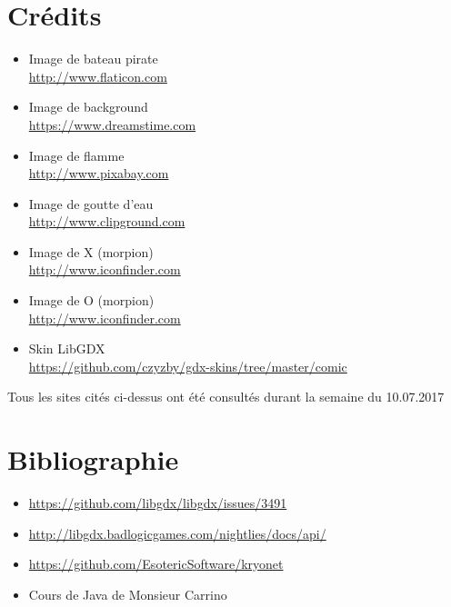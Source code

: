 \documentclass{report}
\begin{document}
\chapter{Crédits}

\begin{itemize}
	\item Image de bateau pirate \\\url{http://www.flaticon.com}
	\item Image de background \\\url{https://www.dreamstime.com}
	\item Image de flamme \\\url{http://www.pixabay.com}
	\item Image de goutte d'eau \\\url{http://www.clipground.com}
	\item Image de X (morpion) \\\url{http://www.iconfinder.com}
	\item Image de O (morpion) \\\url{http://www.iconfinder.com}
	\item Skin LibGDX \\\url{https://github.com/czyzby/gdx-skins/tree/master/comic}
\end{itemize}

Tous les sites cités ci-dessus ont été consultés durant la semaine du 10.07.2017


\chapter{Bibliographie}

\begin{itemize}
	\item \url{https://github.com/libgdx/libgdx/issues/3491}
	\item \url{http://libgdx.badlogicgames.com/nightlies/docs/api/}
	\item \url{https://github.com/EsotericSoftware/kryonet}
	\item Cours de Java de Monsieur Carrino
\end{itemize}
\end{document}
